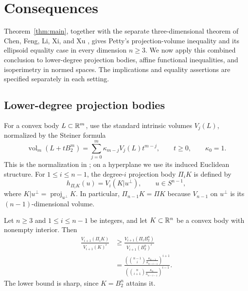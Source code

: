 \section{Consequences}\label{sec:consequences}

Theorem~\ref{thm:main}, together with the separate three-dimensional
theorem of Chen, Feng, Li, Xi, and Xu \cite[Theorem~1.1]{ChenEtAl2026},
gives Petty's projection-volume inequality and its ellipsoid equality
case in every dimension $n\ge3$. We now apply this combined conclusion
to lower-degree projection bodies, affine functional inequalities, and
isoperimetry in normed spaces. The implications and equality assertions
are specified separately in each setting.

\subsection{Lower-degree projection bodies}

For a convex body $L\subset\mathbb R^m$, use the standard intrinsic volumes
$V_j(L)$, normalized by the Steiner formula
\[
 \operatorname{vol}_m(L+tB_2^m)
 =\sum_{j=0}^m\kappa_{m-j}V_j(L)t^{m-j},
 \qquad t\ge0,\qquad \kappa_0=1.
\]
This is the normalization in
\cite[author version, Section~2, p.~6]{OrtegaMorenoSchuster2021};
on a hyperplane we use its induced Euclidean structure. For
$1\le i\le n-1$, the degree-$i$ projection body $\Pi_iK$ is defined by
\[
 h_{\Pi_iK}(u)=V_i(K|u^\perp),\qquad u\in S^{n-1},
\]
where $K|u^\perp=\operatorname{proj}_{u^\perp}K$. In particular,
$\Pi_{n-1}K=\Pi K$ because $V_{n-1}$ on $u^\perp$ is its
$(n-1)$-dimensional volume.

\begin{corollary}
\label{cor:lutwak-petty}
Let $n\ge3$ and $1\le i\le n-1$ be integers, and let
$K\subset\mathbb R^n$ be a convex body with nonempty interior. Then
\begin{equation}\label{eq:lutwak-petty}
\begin{aligned}
 \frac{V_{i+1}(\Pi_iK)}{V_{i+1}(K)^i}
 &\ge
 \frac{V_{i+1}(\Pi_iB_2^n)}{V_{i+1}(B_2^n)^i}\\
 &=
 \frac{\left(\displaystyle\binom{n-1}{i}
              \frac{\kappa_{n-1}}{\kappa_{n-i-1}}\right)^{i+1}}
      {\left(\displaystyle\binom{n}{i+1}
              \frac{\kappa_n}{\kappa_{n-i-1}}\right)^{i-1}}.
\end{aligned}
\end{equation}
The lower bound is sharp, since $K=B_2^n$ attains it.
\end{corollary}

